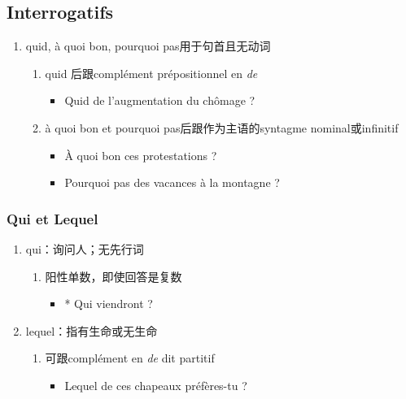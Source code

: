 \documentclass[UTF8]{report}
\begin{document}
\subsection{Interrogatifs}
\begin{enumerate}
    \item quid, à quoi bon, pourquoi pas用于句首且无动词
    \begin{enumerate}
        \item quid 后跟complément prépositionnel en \textit{de}
        \begin{itemize}
            \item Quid de l’augmentation du chômage ?
        \end{itemize}
        \item à quoi bon et pourquoi pas后跟作为主语的syntagme nominal或infinitif
        \begin{itemize}
            \item À quoi bon ces protestations ?
            \item Pourquoi pas des vacances à la montagne ?
        \end{itemize}
    \end{enumerate}
\end{enumerate}

\subsubsection{Qui et Lequel}
\begin{enumerate}
    \item qui：询问人；无先行词
    \begin{enumerate}
        \item 阳性单数，即使回答是复数
        \begin{itemize}
            \item * Qui viendront ?
        \end{itemize}
    \end{enumerate}
    \item lequel：指有生命或无生命
    \begin{enumerate}
        \item 可跟complément en \textit{de} dit partitif
        \begin{itemize}
            \item Lequel de ces chapeaux préfères-tu ?
        \end{itemize}
    \end{enumerate}
\end{enumerate}
\end{document}

